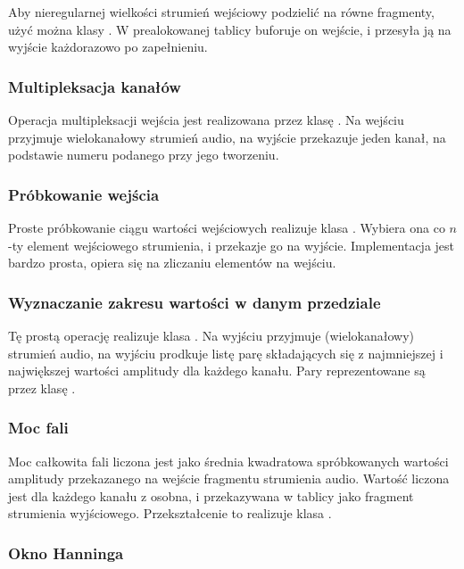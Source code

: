 Aby nieregularnej wielkości strumień wejściowy podzielić na równe fragmenty, użyć można klasy
. W prealokowanej tablicy buforuje on wejście, i przesyła ją na wyjście każdorazowo
po zapełnieniu.


\subsubsection{Multipleksacja kanałów}

Operacja multipleksacji wejścia jest realizowana przez klasę . Na wejściu
przyjmuje wielokanałowy strumień audio, na wyjście przekazuje jeden kanał, na podstawie numeru
podanego przy jego tworzeniu.


\subsubsection{Próbkowanie wejścia}

Proste próbkowanie ciągu wartości wejściowych realizuje klasa . Wybiera ona co $n$-ty
element wejściowego strumienia, i przekazje go na wyjście. Implementacja jest bardzo prosta, opiera
się na zliczaniu elementów na wejściu.


\subsubsection{Wyznaczanie zakresu wartości w danym przedziale}

Tę prostą operację realizuje klasa . Na wyjściu przyjmuje (wielokanałowy)
strumień audio, na wyjściu prodkuje listę parę składających się z najmniejszej i największej
wartości amplitudy dla każdego kanału. Pary reprezentowane są przez klasę .


\subsubsection{Moc fali}

Moc całkowita fali liczona jest jako średnia kwadratowa spróbkowanych wartości amplitudy
przekazanego na wejście fragmentu strumienia audio. Wartość liczona jest dla każdego kanału z
osobna, i przekazywana w tablicy jako fragment strumienia wyjściowego. Przekształcenie to realizuje
klasa .


\subsubsection{Okno Hanninga}

